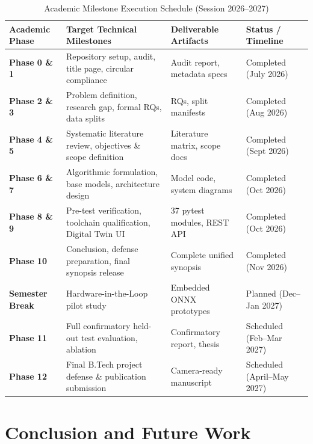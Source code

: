 \documentclass[12pt,a4paper]{article}
\begin{document}
\begin{table}[htbp]
\centering
\small
{}
\caption{Academic Milestone Execution Schedule (Session 2026--2027)}
\label{tab:schedule}
\vspace{4pt}
\begin{tabularx}{\textwidth}{p{2.5cm} p{4.2cm} p{4.0cm} p{3.5cm}}
\toprule
\textbf{Academic Phase} & \textbf{Target Technical Milestones} & \textbf{Deliverable Artifacts} & \textbf{Status / Timeline} \\
\midrule
\textbf{Phase 0 \& 1} & Repository setup, audit, title page, circular compliance & Audit report, metadata specs & Completed (July 2026) \\
\textbf{Phase 2 \& 3} & Problem definition, research gap, formal RQs, data splits & RQs, split manifests & Completed (Aug 2026) \\
\textbf{Phase 4 \& 5} & Systematic literature review, objectives \& scope definition & Literature matrix, scope docs & Completed (Sept 2026) \\
\textbf{Phase 6 \& 7} & Algorithmic formulation, base models, architecture design & Model code, system diagrams & Completed (Oct 2026) \\
\textbf{Phase 8 \& 9} & Pre-test verification, toolchain qualification, Digital Twin UI & 37 pytest modules, REST API & Completed (Oct 2026) \\
\textbf{Phase 10} & Conclusion, defense preparation, final synopsis release & Complete unified synopsis & Completed (Nov 2026) \\
\textbf{Semester Break} & Hardware-in-the-Loop pilot study & Embedded ONNX prototypes & Planned (Dec--Jan 2027) \\
\textbf{Phase 11} & Full confirmatory held-out test evaluation, ablation & Confirmatory report, thesis & Scheduled (Feb--Mar 2027) \\
\textbf{Phase 12} & Final B.Tech project defense \& publication submission & Camera-ready manuscript & Scheduled (April--May 2027) \\
\bottomrule
\end{tabularx}
\end{table}

\section{Conclusion and Future Work}
\end{document}
